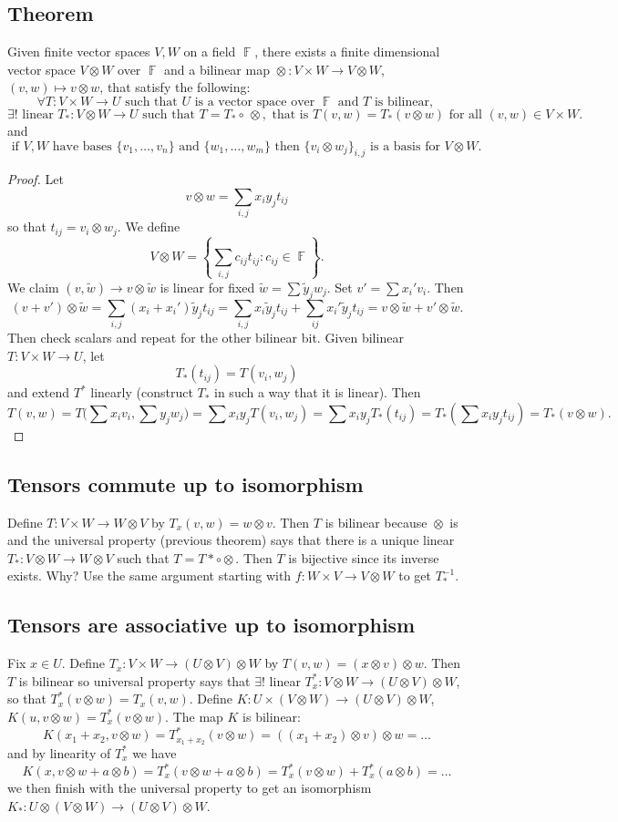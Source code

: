 \documentclass{article}
\DeclareMathOperator\F{\mathbb{F}}
\DeclareMathOperator\ot{\otimes}
\begin{document}
\subsection*{Theorem}
Given finite vector spaces $V,W$ on a field $\F$, there exists a
finite dimensional vector space $V \ot W$ over $\F$
and a bilinear map $\ot: V \times W \to V \ot W$, $(v,w) \mapsto v \ot w$, that satisfy the following:
$$
\forall T: V \times W \to U \text{ such that $U$ is a vector space over $\F$ and $T$ is bilinear, } $$
$$
\exists! \text{ linear } T_*: V \ot W \to U \text{ such that } T = T_* \circ \, \ot, \text{ that is } T(v,w) = T_*(v \ot w) \text{ for all } (v,w) \in V \times W.
$$
and $$
\text{ if $V,W$ have bases $\{ v_1, \hdots, v_n\}$ and $\{ w_1, \hdots, w_m\}$ then $\{v_i \ot w_j \}_{i,j}$ is a basis for $V \ot W$.}
$$
\begin{proof}
Let
$$
v \ot w = \sum_{i,j} x_i y_j t_{ij}
$$
so that $t_{ij} = v_i \ot w_j$. We define
$$
V \ot W = \left \{ \sum_{i,j} c_{ij}t_{ij}: c_{ij} \in \F \right\}.
$$
We claim $(v,\tilde w) \to v \ot \tilde w$ is linear for fixed $\tilde w = \sum \tilde y_j w_j$. Set $v' = \sum x_i' v_i$. Then $$
(v+v') \ot \tilde w = \sum_{i,j} (x_i+x_i')
\tilde y_j t_{ij}  = \sum_{i,j} x_i \tilde
y_j t_{ij} + \sum_{ij} x_i' \tilde y_j t_{ij} =
v \ot \tilde w + v' \ot \tilde w.
$$
Then check scalars and repeat for the other bilinear bit.
Given bilinear $T:V \times W \to U$, let $$
T_*(t_{ij}) = T(v_i,w_j)
$$
and extend $T^*$ linearly (construct $T_*$ in such a way that it is linear).
Then $$
T(v,w) = T \big( \sum x_i v_i, \sum y_j w_j \big) = \sum x_i y_j T(v_i,w_j)
= \sum x_i y_j T_*(t_{ij}) = T_*(\sum x_i y_j t_{ij}) = T_*(v \ot w).
$$
\end{proof}
\subsection*{Tensors commute up to isomorphism}
Define $T: V \times W \to W \ot V$ by $T_x(v,w) = w \ot v$. Then $T$ is bilinear because $\ot$ is and the universal property (previous theorem)
says that there is a unique linear $T_*: V \ot W \to W \ot V$
such that $T = T* \circ \ot$. Then $T$ is bijective since its inverse exists. Why? Use the same argument starting with $f: W \times V \to V \ot W$ to get $T_*^{-1}$.
\subsection*{Tensors are associative up to isomorphism}
Fix $x \in U$. Define $T_x: V \times W \to (U \ot V) \ot W$ by $T(v,w) = (x \ot v) \ot w$. Then $T$ is bilinear so universal property says that $\exists !$ linear $T^*_x: V \ot W \to (U \ot V) \ot W$,
so that $T_x^*(v \ot w) = T_x(v,w)$. Define $K: U \times (V \ot W) \to (U \ot V) \ot W$, $K(u, v \ot w) = T^*_x(v \ot w)$.
The map $K$ is bilinear: $$
K(x_1+x_2,v \ot w) = T_{x_1+x_2}^*(v \ot w) = ((x_1+x_2) \ot v) \ot w = \hdots
$$
and by linearity of $T^*_x$ we have $$
K(x,v \ot w + a \ot b) = T_x^*(v \ot w + a \ot b) = T^*_x(v \ot w) + T^*_x(a \ot b) = \hdots
$$
we then finish with the universal property to get an isomorphism $K_*: U \ot (V \ot W) \to (U \ot V) \ot W$.
\end{document}
